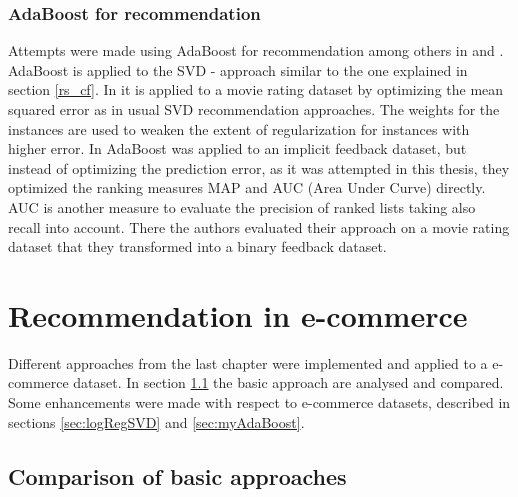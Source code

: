 \documentclass[10pt]{reportMaster}
\begin{document}
\subsection{AdaBoost for recommendation}
\label{sec:adaBoostForRecommendation}
Attempts were made using AdaBoost for recommendation among others in \cite{boostingCFRatings} and \cite{boostingAUC}.
AdaBoost is applied to the SVD - approach similar to the one explained in section \ref{rs_cf}.
In \cite{boostingCFRatings} it is applied to a movie rating dataset by optimizing the mean squared error as in usual SVD recommendation approaches.
The weights for the instances are used to weaken the extent of regularization for instances with higher error.
In \cite{boostingAUC} AdaBoost was applied to an implicit feedback dataset, but instead of optimizing the prediction error, as it was attempted in this thesis, they optimized the ranking measures MAP and AUC (Area Under Curve) directly.
AUC is another measure to evaluate the precision of ranked lists taking also recall into account. %
There the authors evaluated their approach on a movie rating dataset that they transformed into a binary feedback dataset.











\chapter{Recommendation in e-commerce}
\label{sec:ecommerceRec}

Different approaches from the last chapter were implemented and applied to a e-commerce dataset.
In section \ref{sec:comparison} the basic approach are analysed and compared.
Some enhancements were made with respect to e-commerce datasets, described in sections \ref{sec:logRegSVD} and \ref{sec:myAdaBoost}.


\section{Comparison of basic approaches}
\label{sec:comparison}
\end{document}
